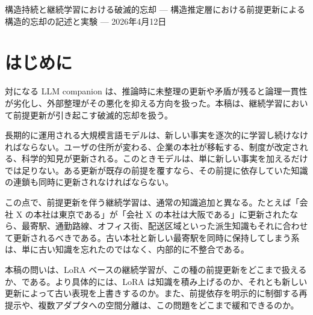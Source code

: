 \documentclass[12pt,a4paper]{article}
\begin{document}
\PaperTitleBlock
  {構造持続と継続学習における破滅的忘却}
  {— 構造推定層における前提更新による構造的忘却の記述と実験 —}
  {2026年4月12日}

\begin{abstract}
大規模言語モデルに新しい知識を逐次的に学習させると、古い知識が壊れることがある。しかし、すべての忘却が同じではない。ある前提が変わったとき、その前提に依存していた知識の連鎖がまとめて崩れる場合がある。本稿ではこれを構造的忘却と呼び、単一の事実の喪失と区別する。

7モデル（1.5B〜72B、4系統）で LoRA による逐次学習を行い、三つの条件を比較した。第一は過去の事実を再提示する基準条件（E-lite）、第二は前提の依存構造を追跡して選択的に再提示する条件（F-v2c）、第三は現在知識と過去知識を別々のアダプタに分離する条件（F-multi）である。全モデル・全条件で、最初の前提更新以降に旧知識の保持が急減した。LoRA は知識を積み上げるというより、上書きに近く振る舞う。前提依存を追跡して選択的に再提示すると依存整合性は改善するが、旧知識の保持忠実度は低いままである。多アダプタ分離は非ゼロの旧知識保持を与えるが、高忠実度の長期保持にはなお届かない。少なくとも本実験条件では、LoRA によるパラメータ更新だけでは依存知識の整合した再編を十分に担えないことが示される。
\end{abstract}

\section{はじめに}\label{ux306fux3058ux3081ux306b}

対になる LLM companion は、推論時に未整理の更新や矛盾が残ると論理一貫性が劣化し、外部整理がその悪化を抑える方向を扱った。本稿は、継続学習において前提更新が引き起こす破滅的忘却を扱う。

長期的に運用される大規模言語モデルは、新しい事実を逐次的に学習し続けなければならない。ユーザの住所が変わる、企業の本社が移転する、制度が改定される、科学的知見が更新される。このときモデルは、単に新しい事実を加えるだけでは足りない。ある更新が既存の前提を覆すなら、その前提に依存していた知識の連鎖も同時に更新されなければならない。

この点で、前提更新を伴う継続学習は、通常の知識追加と異なる。たとえば「会社 X の本社は東京である」が「会社 X の本社は大阪である」に更新されたなら、最寄駅、通勤路線、オフィス街、配送区域といった派生知識もそれに合わせて更新されるべきである。古い本社と新しい最寄駅を同時に保持してしまう系は、単に古い知識を忘れたのではなく、内部的に不整合である。

本稿の問いは、LoRA ベースの継続学習が、この種の前提更新をどこまで扱えるか、である。より具体的には、LoRA は知識を積み上げるのか、それとも新しい更新によって古い表現を上書きするのか。また、前提依存を明示的に制御する再提示や、複数アダプタへの空間分離は、この問題をどこまで緩和できるのか。
\end{document}
